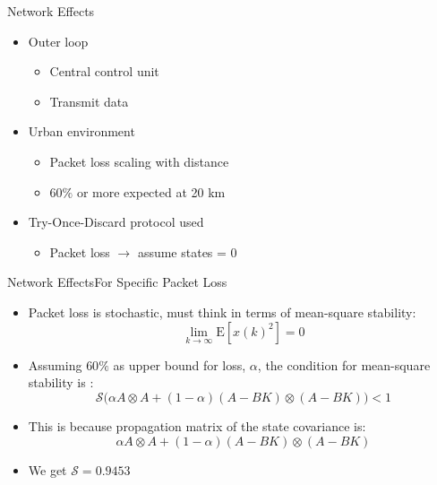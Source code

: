\begin{frame}{Network Effects}
	\begin{itemize}
		\item Outer loop
		\begin{itemize}
			\item Central control unit
			\item Transmit data
		\end{itemize}
		\item Urban environment
		\begin{itemize}
			\item Packet loss scaling with distance
			\item $ 60\% $ or more expected at 20 km \cite{Sheth2007}
		\end{itemize}
		\item Try-Once-Discard protocol used
		\begin{itemize}
			\item Packet loss $\rightarrow$ assume states = 0
		\end{itemize}
	\end{itemize}
	\begin{figure}[h!]
	\centering
	\resizebox{0.9\columnwidth}{!}{
		}
	\label{fig:tikzControlStructure}
\end{figure}
\end{frame}

\begin{frame}{Network Effects}{For Specific Packet Loss}
	\begin{itemize}
	\item Packet loss is stochastic, must think in terms of mean-square stability: 
	\begin{equation}
		\lim_{k \rightarrow \infty} \text{E}[x(k)^2] = 0
	\end{equation}
	\item Assuming $ 60\% $ as upper bound for loss, $ \alpha $, the condition for mean-square stability is \cite{Hu2007}:
	\begin{equation}\label{eq:HuStabCondition}
		\mathcal{S}\Big(\alpha A \otimes A + (1-\alpha)(A-BK) \otimes (A-BK) \Big) < 1
	\end{equation}
		\item This is because propagation matrix of the state covariance is:
	\begin{equation}\label{eq:HuStabCondition}
		\alpha A \otimes A + (1-\alpha)(A-BK) \otimes (A-BK) 
	\end{equation}
		\item We get $\mathcal{S} = 0.9453 $
	\end{itemize}
\end{frame}	
	
